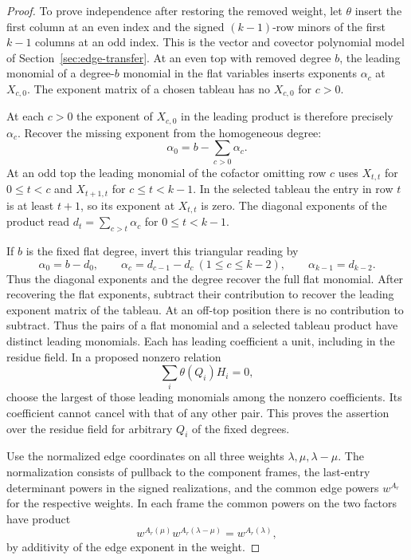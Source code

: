 \begin{proof}
To prove independence after restoring the removed weight, let
\(\theta\) insert the first column at an even index and the
signed \((k-1)\)-row minors of the first \(k-1\) columns at an
odd index. This is the vector and covector polynomial model of
Section~\ref{sec:edge-transfer}. At an even top with removed
degree \(b\), the leading monomial of a degree-\(b\) monomial
in the flat variables inserts exponents \(\alpha_c\) at
\(X_{c,0}\). The exponent matrix of a chosen tableau has no
\(X_{c,0}\) for \(c>0\).

At each \(c>0\) the exponent of \(X_{c,0}\) in the leading product
is therefore precisely \(\alpha_c\). Recover the missing exponent from
the homogeneous degree:
\[
 \alpha_0=b-\sum_{c>0}\alpha_c.
\] At an odd top the leading
monomial of the cofactor omitting row \(c\) uses \(X_{t,t}\)
for \(0\le t<c\) and \(X_{t+1,t}\) for \(c\le t<k-1\).
In the selected tableau the entry in row \(t\) is at least
\(t+1\), so its exponent at \(X_{t,t}\) is zero. The diagonal exponents of the product read
\(d_t=\sum_{c>t}\alpha_c\) for \(0\le t<k-1\).

If \(b\) is the fixed flat degree, invert this triangular
reading by
\[
     \alpha_0=b-d_0,\qquad
     \alpha_c=d_{c-1}-d_c\ (1\le c\le k-2),\qquad
     \alpha_{k-1}=d_{k-2}.
\]
Thus the diagonal exponents and the degree recover the
full flat monomial. After recovering the flat exponents, subtract their contribution
to recover the leading exponent matrix of the tableau. At an
off-top position there is no contribution to subtract. Thus the
pairs of a flat monomial and a selected tableau product have
distinct leading monomials. Each has leading coefficient a unit,
including in the residue field. In a proposed nonzero relation
\[
 \sum_i\theta(Q_i)H_i=0,
\]
choose the largest of those leading
monomials among the nonzero coefficients. Its coefficient cannot
cancel with that of any other pair. This proves the assertion
over the residue field for arbitrary \(Q_i\) of the fixed degrees.

Use the normalized edge coordinates on all three weights
\(\lambda,\mu,\lambda-\mu\). The normalization consists of
pullback to the component frames, the last-entry determinant
powers in the signed realizations, and the common edge powers
\(w^{A_r}\) for the respective weights. In each frame the common powers on the two factors have product
\[
 w^{A_r(\mu)}w^{A_r(\lambda-\mu)}=w^{A_r(\lambda)},
\]
by additivity of the edge exponent in the weight.


\end{proof}
